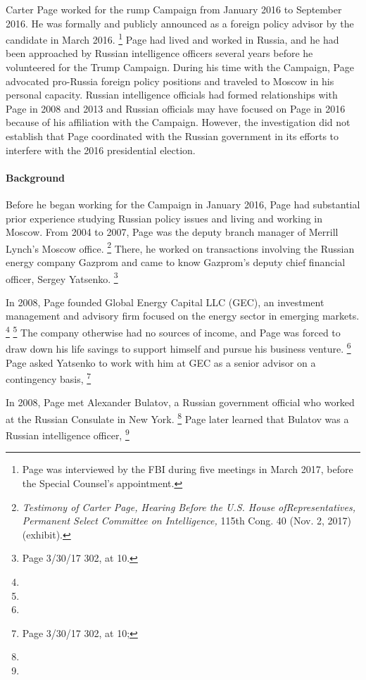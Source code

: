 Carter Page worked for the rump Campaign from January 2016 to September 2016.
He was formally and publicly announced as a foreign policy advisor by the candidate in March 2016.%
\footnote{Page was interviewed by the FBI during five meetings in March 2017, before the Special Counsel's appointment.
}
Page had lived and worked in Russia, and he had been approached by Russian intelligence officers several years before he volunteered for the Trump Campaign.
During his time with the Campaign, Page advocated pro-Russia foreign policy positions and traveled to Moscow in his personal capacity.
Russian intelligence officials had formed relationships with Page in 2008 and 2013 and Russian officials may have focused on Page in 2016 because of his affiliation with the Campaign.
However, the investigation did not establish that Page coordinated with the Russian government in its efforts to interfere with the 2016 presidential election.

\paragraph{Background}

Before he began working for the Campaign in January 2016, Page had substantial prior experience studying Russian policy issues and living and working in Moscow.
From 2004 to 2007, Page was the deputy branch manager of Merrill Lynch's Moscow office.%
\footnote{\textit{Testimony of Carter Page, Hearing Before the U.S. House ofRepresentatives, Permanent Select Committee on Intelligence,} 115th Cong. 40 (Nov. 2, 2017) (exhibit).}
There, he worked on transactions involving the Russian energy company Gazprom and came to know Gazprom's deputy chief financial officer, Sergey Yatsenko.%
\footnote{Page 3/30/17 302, at 10.}

In 2008, Page founded Global Energy Capital LLC (GEC), an investment management and advisory firm focused on the energy sector in emerging markets.%
\footnote{}
\footnote{}
The company otherwise had no sources of income, and Page was forced to draw down his life savings to support himself and pursue his business venture.%
\footnote{}
Page asked Yatsenko to work with him at GEC as a senior advisor on a contingency basis,
\footnote{Page 3/30/17 302, at 10; }

In 2008, Page met Alexander Bulatov, a Russian government official who worked at the Russian Consulate in New York.%
\footnote{}
Page later learned that Bulatov was a Russian intelligence officer,
\footnote{}

